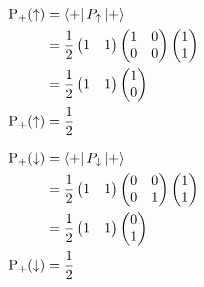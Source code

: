 \documentclass[a4paper, 10pt]{article}
\begin{document}
\begin{solution}
	\noindent
	\begin{minipage}[t]{0.46\textwidth}
		\begin{align*}
			\text{P}_{+}(\uparrow) & = \bra{+} P_{\uparrow} \ket{+}                                                                                                      \\
			                       & = \frac{1}{2} \begin{pmatrix} 1 & 1 \end{pmatrix} \begin{pmatrix} 1 & 0 \\ 0 & 0 \end{pmatrix} \begin{pmatrix} 1 \\ 1 \end{pmatrix} \\
			                       & = \frac{1}{2} \begin{pmatrix} 1 & 1 \end{pmatrix} \begin{pmatrix} 1 \\ 0 \end{pmatrix}                                              \\
			\text{P}_{+}(\uparrow) & = \frac{1}{2}
		\end{align*}
	\end{minipage}%
	\hfill \vrule \hfill
	\begin{minipage}[t]{0.46\textwidth}
		\begin{align*}
			\text{P}_{+}(\downarrow) & = \bra{+} P_{\downarrow} \ket{+}                                                                                                    \\
			                         & = \frac{1}{2} \begin{pmatrix} 1 & 1 \end{pmatrix} \begin{pmatrix} 0 & 0 \\ 0 & 1 \end{pmatrix} \begin{pmatrix} 1 \\ 1 \end{pmatrix} \\
			                         & = \frac{1}{2} \begin{pmatrix} 1 & 1 \end{pmatrix} \begin{pmatrix} 0 \\ 1 \end{pmatrix}                                              \\
			\text{P}_{+}(\downarrow) & = \frac{1}{2}
		\end{align*}
	\end{minipage}


\end{solution}
\end{document}
